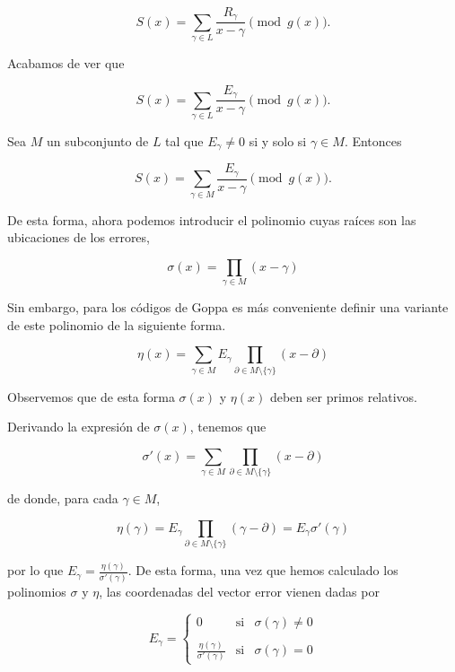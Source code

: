 $$S(x) = \sum_{\gamma \in L} \frac{R_\gamma}{x - \gamma} \pmod{g(x)}.$$

Acabamos de ver que 

$$S(x) = \sum_{\gamma \in L} \frac{E_\gamma}{x - \gamma} \pmod{g(x)}.$$

Sea $M$ un subconjunto de $L$ tal que $E_{\gamma} \neq 0$ si y solo si $\gamma \in M$. Entonces

\begin{equation}
    \label{def:sindrome}
    S(x) = \sum_{\gamma \in M} \frac{E_\gamma}{x - \gamma} \pmod{g(x)}.
\end{equation}

De esta forma, ahora podemos introducir el polinomio cuyas raíces son las ubicaciones de los errores,

\begin{equation}
    \label{def:localizaciones}
    \sigma (x) = \prod_{\gamma \in M} (x - \gamma)
\end{equation}

Sin embargo, para los códigos de Goppa es más conveniente definir una variante de este polinomio de la siguiente forma.

\begin{equation}
    \label{def:eta}
    \eta (x) = \sum_{\gamma \in M} E_\gamma \prod_{\partial \in M \setminus \{ \gamma \} } (x - \partial)
\end{equation}

Observemos que de esta forma $\sigma(x)$ y $\eta(x)$ deben ser primos relativos.

Derivando la expresión de $\sigma(x)$, tenemos que 

\begin{equation}
    \label{def:localizaciones_derivada}
    \sigma'(x) = \sum_{\gamma \in M} \prod_{\partial \in M \setminus \{ \gamma \} } (x - \partial)
\end{equation}


de donde, para cada $\gamma \in M$,

$$\eta (\gamma) = E_\gamma \prod_{\partial \in M \setminus \{ \gamma \} } (\gamma - \partial) = E_\gamma \sigma'(\gamma)$$

por lo que $E_\gamma = \frac{\eta(\gamma)}{\sigma'(\gamma)}$. De esta forma, una vez que hemos calculado los polinomios $\sigma$ y $\eta$, las coordenadas del vector error vienen dadas por 

\[
    E_\gamma = \left\{ \begin{array}{lcc}
    0 &   \text{si}  & \sigma(\gamma) \neq 0 \\
    \\ \frac{\eta(\gamma)}{\sigma'(\gamma)} &  \text{si} & \sigma(\gamma) = 0
    \end{array}
    \right.
\]

